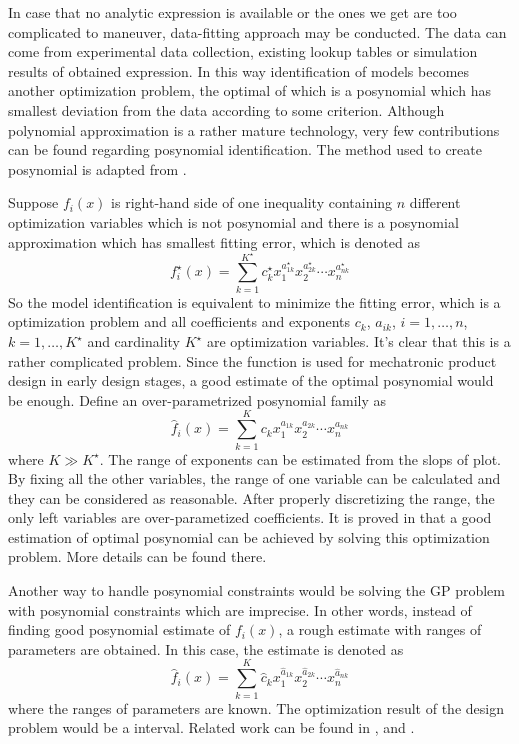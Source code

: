 In case that no analytic expression is available or the ones we get are too complicated to maneuver, data-fitting approach may be conducted. The data can come from experimental data collection, existing lookup tables or simulation results of obtained expression. In this way identification of models becomes another optimization problem, the optimal of which is a posynomial which has smallest deviation from the data according to some criterion. Although polynomial approximation is a rather mature technology, very few contributions can be found regarding posynomial identification. The method used to create posynomial is adapted from \cite{Posynomial2015}. 

Suppose $f_i(x)$ is right-hand side of one inequality containing $n$ different optimization variables which is not posynomial and there is a posynomial approximation which has smallest fitting error, which is denoted as $$f_i^\star(x)=\sum_{k=1}^{K^\star} c_k^\star x_1^{{a_{1k}^\star}}x_2^{{a_{2k}^\star}}\cdots x_n^{{a_{nk}^\star}}$$
So the model identification is equivalent to minimize the fitting error, which is a optimization problem and all coefficients and exponents $c_k$, $a_{ik}$, $i=1,\ldots,n$, $k=1,\ldots,K^\star$ and cardinality $K^\star$ are optimization variables. It's clear that this is a rather complicated problem. Since the function is used for mechatronic product design in early design stages, a good estimate of the optimal posynomial would be enough. Define an over-parametrized posynomial family as $$\hat{f}_i(x)=\sum_{k=1}^K c_k x_1^{a_{1k}}x_2^{a_{2k}}\cdots x_n^{a_{nk}}$$ where $K \gg K^\star$. The range of exponents can be estimated from the slops of plot. By fixing all the other variables, the range of one variable can be calculated and they can be considered as reasonable. After properly discretizing the range, the only left variables are over-parametized coefficients. It is proved in \cite{Posynomial2015} that a good estimation of optimal posynomial can be achieved by solving this optimization problem. More details can be found there.

Another way to handle posynomial constraints would be solving the GP problem with posynomial constraints which are imprecise. In other words, instead of finding good posynomial estimate of $f_i(x)$, a rough estimate with ranges of parameters are obtained. In this case, the estimate is denoted as $$\hat{f}_i(x)=\sum_{k=1}^K \hat{c}_{k} x_1^{\hat{a}_{1k}}x_2^{\hat{a}_{2k}}\cdots x_n^{\hat{a}_{nk}}$$ where the ranges of parameters are known. The optimization result of the design problem would be a interval. Related work can be found in \cite{liu2007geometric}, \cite{liu2009using} and \cite{mahapatra2012posynomial}.

